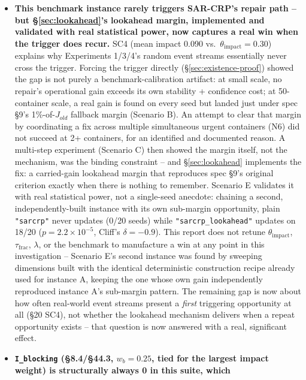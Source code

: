 \documentclass[11pt]{article}
\begin{document}
\begin{itemize}
    omitted, per spec \S23's own framing of it as optional -- noted here
    explicitly rather than silently dropped.
  \item \textbf{This benchmark instance rarely triggers SAR-CRP's repair
    path -- but \S\ref{sec:lookahead}'s lookahead margin, implemented and
    validated with real statistical power, now captures a real win when
    the trigger does recur.} SC4 (mean impact 0.090 vs.\
    $\theta_{\text{impact}}=0.30$) explains why Experiments 1/3/4's random
    event streams essentially never cross the trigger. Forcing the trigger
    directly (\S\ref{sec:existence-proof}) showed the gap is not purely a
    benchmark-calibration artifact: at small scale, no repair's operational
    gain exceeds its own stability + confidence cost; at 50-container
    scale, a real gain is found on every seed but landed just under spec
    \S9's 1\%-of-$J_{old}$ fallback margin (Scenario B). An attempt to
    clear that margin by coordinating a fix across multiple simultaneous
    urgent containers (N6) did not succeed at 2+ containers, for an
    identified and documented reason. A multi-step experiment (Scenario C)
    then showed the margin itself, not the mechanism, was the binding
    constraint -- and \S\ref{sec:lookahead} implements the fix: a
    carried-gain lookahead margin that reproduces spec \S9's original
    criterion exactly when there is nothing to remember. Scenario E
    validates it with real statistical power, not a single-seed anecdote:
    chaining a second, independently-built instance with its own
    sub-margin opportunity, plain \texttt{"sarcrp"} never updates (0/20
    seeds) while \texttt{"sarcrp\_lookahead"} updates on 18/20
    ($p=2.2\times10^{-5}$, Cliff's $\delta=-0.9$). This report does not
    retune $\theta_{\text{impact}}$, $\tau_{\text{frac}}$, $\lambda$, or
    the benchmark to manufacture a win at any point in this investigation
    -- Scenario E's second instance was found by sweeping dimensions built
    with the identical deterministic construction recipe already used for
    instance A, keeping the one whose own gain independently reproduced
    instance A's sub-margin pattern. The remaining gap is now about how
    often real-world event streams present a \emph{first} triggering
    opportunity at all (\S20 SC4), not whether the lookahead mechanism
    delivers when a repeat opportunity exists -- that question is now
    answered with a real, significant effect.
  \item \textbf{\texttt{I\_blocking} (\S8.4/\S44.3, $w_b=0.25$, tied for the
    largest impact weight) is structurally always 0 in this suite, which
}
\end{itemize}
\end{document}
